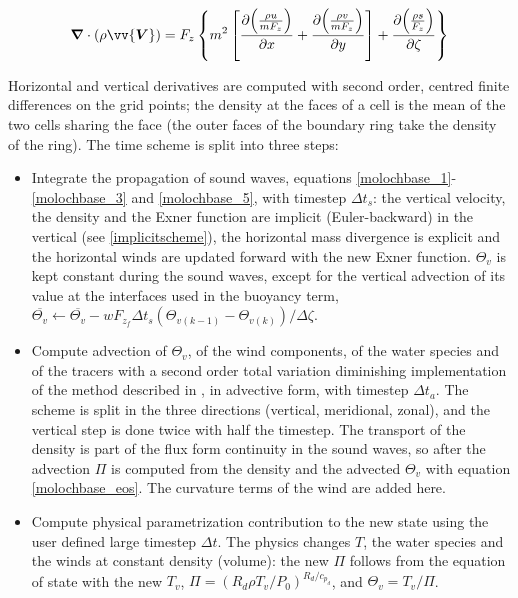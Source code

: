 \begin{equation}
  \label{total_divergence}
  \bm{\nabla} \cdot (\rho \vv{\bm{V}}) = F_z \left\{ m^2 \left[
    \frac{\partial{ \left(\frac{\rho u}{m F_z} \right)}}{\partial x} +
    \frac{\partial{ \left(\frac{\rho v}{m F_z} \right)}}{\partial y} \right] +
  \frac{\partial{ \left(\frac{\rho s}{F_z} \right)}}{\partial \zeta} \right\}
\end{equation}

Horizontal and vertical derivatives are computed with second order, centred
finite differences on the grid points; the density at the faces of a cell is
the mean of the two cells sharing the face (the outer faces of the boundary
ring take the density of the ring). The time scheme is split into three
steps:

\begin{itemize}
  \item Integrate the propagation of sound waves, equations
    \ref{molochbase_1}-\ref{molochbase_3} and \ref{molochbase_5}, with
    timestep $\Delta t_s$: the vertical velocity, the density and the Exner
    function are implicit (Euler-backward) in the vertical (see
    \ref{implicitscheme}), the horizontal mass divergence is explicit and
    the horizontal winds are updated forward with the new Exner function.
    $\Theta_v$ is kept constant during the sound waves, except for the
    vertical advection of its value at the interfaces used in the buoyancy
    term, $\overline{\Theta_v} \leftarrow \overline{\Theta_v} -
    w F_{z_f} \Delta t_s (\Theta_{v(k-1)} - \Theta_{v(k)}) / \Delta \zeta$.
  \item Compute advection of $\Theta_v$, of the wind components, of the
    water species and of the tracers with a second order total variation
    diminishing implementation of the \cite{Godunov_59} method described in
    \cite{hubbard2003three}, in advective form, with timestep $\Delta t_a$.
    The scheme is split in the three directions (vertical, meridional,
    zonal), and the vertical step is done twice with half the timestep.
    The transport of the density is part of the flux form continuity in
    the sound waves, so after the advection $\Pi$ is computed from the
    density and the advected $\Theta_v$ with equation \ref{molochbase_eos}.
    The curvature terms of the wind are added here.
  \item Compute physical parametrization contribution to the new state
    using the user defined large timestep $\Delta t$. The physics changes
    $T$, the water species and the winds at constant density (volume): the
    new $\Pi$ follows from the equation of state with the new $T_v$,
    $\Pi = (R_d \rho T_v / P_0)^{R_d/c_{p_d}}$, and $\Theta_v = T_v/\Pi$.
\end{itemize}


